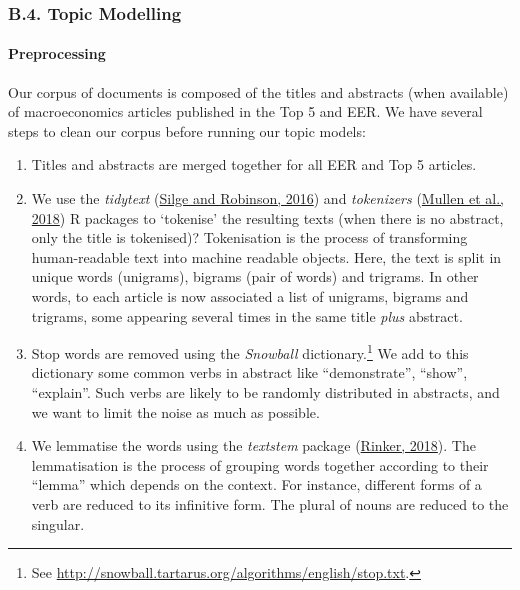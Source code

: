 \documentclass[
  12pt,
  onecolumn]{article}
\providecommand{\tightlist}{%
  \setlength{\itemsep}{0pt}\setlength{\parskip}{0pt}}
\begin{document}
\hypertarget{topic}{%
\subsubsection*{B.4. Topic Modelling}\label{topic}}

\hypertarget{preprocessing}{%
\paragraph*{Preprocessing}\label{preprocessing}}

Our corpus of documents is composed of the titles and abstracts (when available) of macroeconomics articles published in the Top 5 and EER. We have several steps to clean our corpus before running our topic models:

\begin{enumerate}
\def\labelenumi{\arabic{enumi}.}
\tightlist
\item
  Titles and abstracts are merged together for all EER and Top 5 articles.
\item
  We use the \emph{tidytext} (\protect\hyperlink{ref-silge2016a}{Silge and Robinson, 2016}) and \emph{tokenizers} (\protect\hyperlink{ref-mullen2018}{Mullen et al., 2018}) R packages to `tokenise' the resulting texts (when there is no abstract, only the title is tokenised)? Tokenisation is the process of transforming human-readable text into machine readable objects. Here, the text is split in unique words (unigrams), bigrams (pair of words) and trigrams. In other words, to each article is now associated a list of unigrams, bigrams and trigrams, some appearing several times in the same title \emph{plus} abstract.
\item
  Stop words are removed using the \emph{Snowball} dictionary.\footnote{See \url{http://snowball.tartarus.org/algorithms/english/stop.txt}.} We add to this dictionary some common verbs in abstract like ``demonstrate'', ``show'', ``explain''. Such verbs are likely to be randomly distributed in abstracts, and we want to limit the noise as much as possible.
\item
  We lemmatise the words using the \emph{textstem} package (\protect\hyperlink{ref-rinker2018}{Rinker, 2018}). The lemmatisation is the process of grouping words together according to their ``lemma'' which depends on the context. For instance, different forms of a verb are reduced to its infinitive form. The plural of nouns are reduced to the singular.
\end{enumerate}
\end{document}

